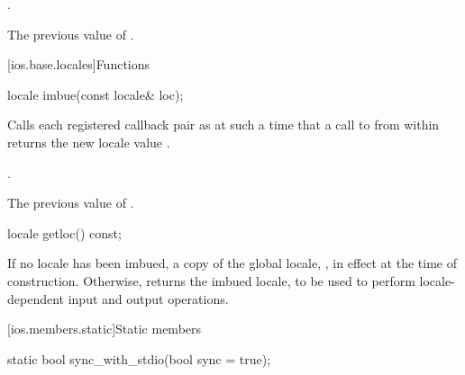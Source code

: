 \begin{itemdescr}
\pnum
\ensures
{}.

\pnum
\returns
The previous value of
.
\end{itemdescr}

[ios.base.locales]{Functions}

\begin{indexed}{}
\begin{itemdecl}
locale imbue(const locale& loc);
\end{itemdecl}
\end{indexed}

\begin{itemdescr}
\pnum
\effects
Calls each registered callback pair
as
at such a time that a call to
from within
returns the new locale value
.

\pnum
\ensures
{}.

\pnum
\returns
The previous value of
.
\end{itemdescr}

%
\begin{itemdecl}
locale getloc() const;
\end{itemdecl}

\begin{itemdescr}
\pnum
\returns
If no locale has been imbued, a copy of the global \Cpp{} locale,
,
in effect at the time of construction.
Otherwise, returns the imbued locale, to be used to
perform locale-dependent input and output operations.
\end{itemdescr}

[ios.members.static]{Static members}

%
\begin{itemdecl}
static bool sync_with_stdio(bool sync = true);
\end{itemdecl}

